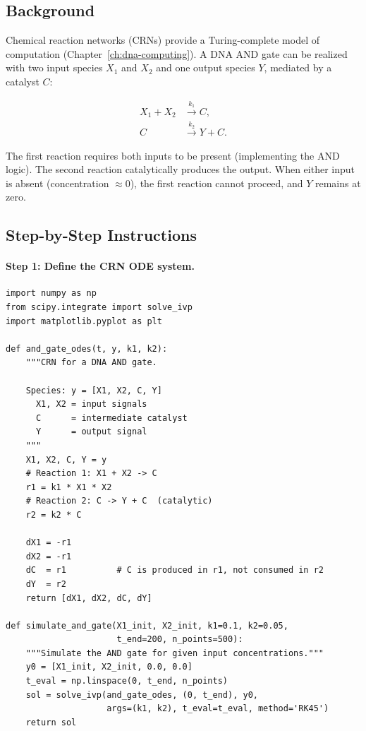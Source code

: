 \subsection{Background}

Chemical reaction networks (CRNs) provide a Turing-complete model of computation (Chapter~\ref{ch:dna-computing}). A DNA AND gate can be realized with two input species $X_1$ and $X_2$ and one output species $Y$, mediated by a catalyst $C$:

\begin{align}
X_1 + X_2 &\xrightarrow{k_1} C, \label{eq:and-step1} \\
C &\xrightarrow{k_2} Y + C. \label{eq:and-step2}
\end{align}

The first reaction requires both inputs to be present (implementing the AND logic). The second reaction catalytically produces the output. When either input is absent (concentration $\approx 0$), the first reaction cannot proceed, and $Y$ remains at zero.

\subsection{Step-by-Step Instructions}

\paragraph{Step 1: Define the CRN ODE system.}

\begin{lstlisting}[style=dogmapython, caption={Lab 3: AND gate CRN as ODEs.}]
import numpy as np
from scipy.integrate import solve_ivp
import matplotlib.pyplot as plt

def and_gate_odes(t, y, k1, k2):
    """CRN for a DNA AND gate.

    Species: y = [X1, X2, C, Y]
      X1, X2 = input signals
      C      = intermediate catalyst
      Y      = output signal
    """
    X1, X2, C, Y = y
    # Reaction 1: X1 + X2 -> C
    r1 = k1 * X1 * X2
    # Reaction 2: C -> Y + C  (catalytic)
    r2 = k2 * C

    dX1 = -r1
    dX2 = -r1
    dC  = r1          # C is produced in r1, not consumed in r2
    dY  = r2
    return [dX1, dX2, dC, dY]

def simulate_and_gate(X1_init, X2_init, k1=0.1, k2=0.05,
                      t_end=200, n_points=500):
    """Simulate the AND gate for given input concentrations."""
    y0 = [X1_init, X2_init, 0.0, 0.0]
    t_eval = np.linspace(0, t_end, n_points)
    sol = solve_ivp(and_gate_odes, (0, t_end), y0,
                    args=(k1, k2), t_eval=t_eval, method='RK45')
    return sol
\end{lstlisting}

